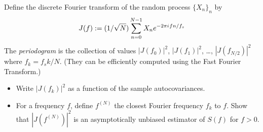 \documentclass[11pt]{article}
\begin{document}
\begin{exercise}
Define the discrete Fourier transform of the random process $\{X_n\}_n$ by
\begin{equation}
    J(f) := (1/\sqrt{N})\sum_{n=0}^{N-1} X_n e^{-2\pi{i\mkern1mu} f n/f_s}
\end{equation}
The \textit{periodogram} is the collection of values $|J(f_0)|^2$, $|J(f_1)|^2$, \dots, $|J(f_{N/2})|^2$ where $f_k = f_s k/N$.
(They can be efficiently computed using the Fast Fourier Transform.)
\begin{itemize}
    \item Write $|J(f_k)|^2$ as a function of the sample autocovariances.
    \item For a frequency $f$, define $f^{(N)}$ the closest Fourier frequency $f_k$ to $f$.
    Show that $|J(f^{(N)})|^2$ is an asymptotically unbiased estimator of $S(f)$ for $f>0$.
\end{itemize}
\end{exercise}

\begin{solution}
    
\end{solution}
\end{document}
